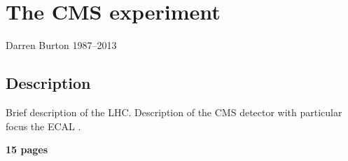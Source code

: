 \chapter{The CMS experiment}
\label{chap:cms}
{Darren Burton 1987--2013}

\section{Description}

Brief description of the LHC. Description of the CMS detector with particular focus the ECAL .

\textbf{15 pages}